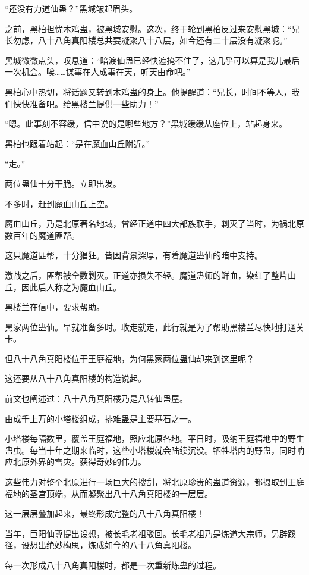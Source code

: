 \begin{this_body}
“还没有力道仙蛊？”黑城皱起眉头。

之前，黑柏担忧木鸡蛊，被黑城安慰。这次，终于轮到黑柏反过来安慰黑城：“兄长勿虑，八十八角真阳楼总共要凝聚八十八层，如今还有二十层没有凝聚呢。”

黑城微微点头，叹息道：“暗渡仙蛊已经快遮掩不住了，这几乎可以算是我儿最后一次机会。唉……谋事在人成事在天，听天由命吧。”

黑柏心中热切，将话题又转到木鸡蛊的身上。他提醒道：“兄长，时间不等人，我们快快准备吧。给黑楼兰提供一些助力！”

“嗯。此事刻不容缓，信中说的是哪些地方？”黑城缓缓从座位上，站起身来。

黑柏也跟着站起：“是在魔血山丘附近。”

“走。”

两位蛊仙十分干脆。立即出发。

不多时，赶到魔血山丘上空。

魔血山丘，乃是北原著名地域，曾经正道中四大部族联手，剿灭了当时，为祸北原数百年的魔道匪帮。

这只魔道匪帮，十分猖狂。皆因背景深厚，有着魔道蛊仙的暗中支持。

激战之后，匪帮被全数剿灭。正道亦损失不轻。魔道蛊师的鲜血，染红了整片山丘，因此后人称之为魔血山丘。

黑楼兰在信中，要求帮助。

黑家两位蛊仙。早就准备多时。收走就走，此行就是为了帮助黑楼兰尽快地打通关卡。

但八十八角真阳楼位于王庭福地，为何黑家两位蛊仙却来到这里呢？

这还要从八十八角真阳楼的构造说起。

前文也阐述过：八十八角真阳楼乃是八转仙蛊屋。

由成千上万的小塔楼组成，排难蛊是主要基石之一。

小塔楼每隔数里，覆盖王庭福地，照应北原各地。平日时，吸纳王庭福地中的野生蛊虫。每当十年之期来临时，这些小塔楼就会陆续沉没。牺牲塔内的野蛊，同时响应北原外界的雪灾。获得奇妙的伟力。

这些伟力对整个北原进行一场巨大的搜刮，将北原珍贵的蛊道资源，都摄取到王庭福地的圣宫顶端，从而凝聚出八十八角真阳楼的一层层。

这一层层叠加起来，最终形成完整的八十八角真阳楼！

当年，巨阳仙尊提出设想，被长毛老祖驳回。长毛老祖乃是炼道大宗师，另辟蹊径，设想出绝妙构思，炼成如今的八十八角真阳楼。

每一次形成八十八角真阳楼时，都是一次重新炼蛊的过程。


\end{this_body}
